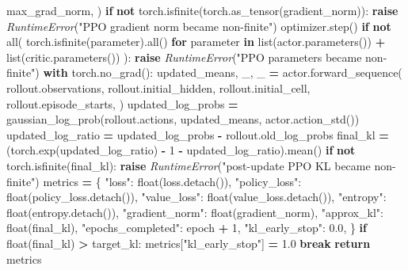 \documentclass[
  chinese,
  11pt,
  letterpaper,
]{article}
\newenvironment{Shaded}{\begin{snugshade}}{\end{snugshade}}
\newcommand{\BuiltInTok}[1]{#1}
\newcommand{\ControlFlowTok}[1]{\textcolor[rgb]{0.13,0.29,0.53}{\textbf{#1}}}
\newcommand{\DecValTok}[1]{\textcolor[rgb]{0.00,0.00,0.81}{#1}}
\newcommand{\FloatTok}[1]{\textcolor[rgb]{0.00,0.00,0.81}{#1}}
\newcommand{\KeywordTok}[1]{\textcolor[rgb]{0.13,0.29,0.53}{\textbf{#1}}}
\newcommand{\NormalTok}[1]{#1}
\newcommand{\OperatorTok}[1]{\textcolor[rgb]{0.81,0.36,0.00}{\textbf{#1}}}
\newcommand{\PreprocessorTok}[1]{\textcolor[rgb]{0.56,0.35,0.01}{\textit{#1}}}
\newcommand{\StringTok}[1]{\textcolor[rgb]{0.31,0.60,0.02}{#1}}
\renewenvironment{Shaded}{\par\smallskip}{\par\smallskip}
\begin{document}
\begin{Shaded}
\begin{Highlighting}[]
\NormalTok{            max\_grad\_norm,}
\NormalTok{        )}
        \ControlFlowTok{if} \KeywordTok{not}\NormalTok{ torch.isfinite(torch.as\_tensor(gradient\_norm)):}
            \ControlFlowTok{raise} \PreprocessorTok{RuntimeError}\NormalTok{(}\StringTok{"PPO gradient norm became non{-}finite"}\NormalTok{)}
\NormalTok{        optimizer.step()}
        \ControlFlowTok{if} \KeywordTok{not} \BuiltInTok{all}\NormalTok{(}
\NormalTok{            torch.isfinite(parameter).}\BuiltInTok{all}\NormalTok{()}
            \ControlFlowTok{for}\NormalTok{ parameter }\KeywordTok{in} \BuiltInTok{list}\NormalTok{(actor.parameters()) }\OperatorTok{+} \BuiltInTok{list}\NormalTok{(critic.parameters())}
\NormalTok{        ):}
            \ControlFlowTok{raise} \PreprocessorTok{RuntimeError}\NormalTok{(}\StringTok{"PPO parameters became non{-}finite"}\NormalTok{)}
        \ControlFlowTok{with}\NormalTok{ torch.no\_grad():}
\NormalTok{            updated\_means, \_, \_ }\OperatorTok{=}\NormalTok{ actor.forward\_sequence(}
\NormalTok{                rollout.observations, rollout.initial\_hidden, rollout.initial\_cell,}
\NormalTok{                rollout.episode\_starts,}
\NormalTok{            )}
\NormalTok{            updated\_log\_probs }\OperatorTok{=}\NormalTok{ gaussian\_log\_prob(rollout.actions, updated\_means, actor.action\_std())}
\NormalTok{            updated\_log\_ratio }\OperatorTok{=}\NormalTok{ updated\_log\_probs }\OperatorTok{{-}}\NormalTok{ rollout.old\_log\_probs}
\NormalTok{            final\_kl }\OperatorTok{=}\NormalTok{ (torch.exp(updated\_log\_ratio) }\OperatorTok{{-}} \DecValTok{1} \OperatorTok{{-}}\NormalTok{ updated\_log\_ratio).mean()}
        \ControlFlowTok{if} \KeywordTok{not}\NormalTok{ torch.isfinite(final\_kl):}
            \ControlFlowTok{raise} \PreprocessorTok{RuntimeError}\NormalTok{(}\StringTok{"post{-}update PPO KL became non{-}finite"}\NormalTok{)}
\NormalTok{        metrics }\OperatorTok{=}\NormalTok{ \{}
            \StringTok{"loss"}\NormalTok{: }\BuiltInTok{float}\NormalTok{(loss.detach()),}
            \StringTok{"policy\_loss"}\NormalTok{: }\BuiltInTok{float}\NormalTok{(policy\_loss.detach()),}
            \StringTok{"value\_loss"}\NormalTok{: }\BuiltInTok{float}\NormalTok{(value\_loss.detach()),}
            \StringTok{"entropy"}\NormalTok{: }\BuiltInTok{float}\NormalTok{(entropy.detach()),}
            \StringTok{"gradient\_norm"}\NormalTok{: }\BuiltInTok{float}\NormalTok{(gradient\_norm),}
            \StringTok{"approx\_kl"}\NormalTok{: }\BuiltInTok{float}\NormalTok{(final\_kl),}
            \StringTok{"epochs\_completed"}\NormalTok{: epoch }\OperatorTok{+} \DecValTok{1}\NormalTok{,}
            \StringTok{"kl\_early\_stop"}\NormalTok{: }\FloatTok{0.0}\NormalTok{,}
\NormalTok{        \}}
        \ControlFlowTok{if} \BuiltInTok{float}\NormalTok{(final\_kl) }\OperatorTok{\textgreater{}}\NormalTok{ target\_kl:}
\NormalTok{            metrics[}\StringTok{"kl\_early\_stop"}\NormalTok{] }\OperatorTok{=} \FloatTok{1.0}
            \ControlFlowTok{break}
    \ControlFlowTok{return}\NormalTok{ metrics}



\end{Highlighting}
\end{Shaded}
\end{document}
